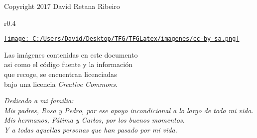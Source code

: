 \documentclass[10pt, a4paper, twoside]{report} %
\begin{document}




\newpage
$\ $
\thispagestyle{empty} %
\null\vfill
\noindent

%


\newpage
$\ $
\thispagestyle{empty} %
\null\vfill
\noindent


\textcopyright \hspace{0.3cm} Copyright $2017$ David Retana Ribeiro\\

\begin{wrapfigure}{r}{0.4\textwidth}
  \begin{center}
    \href{https://creativecommons.org/licenses/by-sa/3.0/es/}
         {\texttt{[image: C:/Users/David/Desktop/TFG/TFGLatex/imagenes/cc-by-sa.png]}}
  \end{center}
\end{wrapfigure}
\noindent Las imágenes contenidas en este documento \\
asi como el código fuente y la información \\
que recoge, se encuentran licenciadas \\
bajo una licencia \textit{Creative Commons}.

\clearpage

\begin{flushright}
  \textit{Dedicado a mi familia: \\
  Mis padres, Rosa y Pedro, por ese apoyo incondicional a lo largo de toda mi vida. \\
  Mis hermanos, Fátima y Carlos, por los buenos momentos.\\
  Y a todas aquellas personas que han pasado por mi vida.}
\end{flushright}
\newpage
\end{document}
